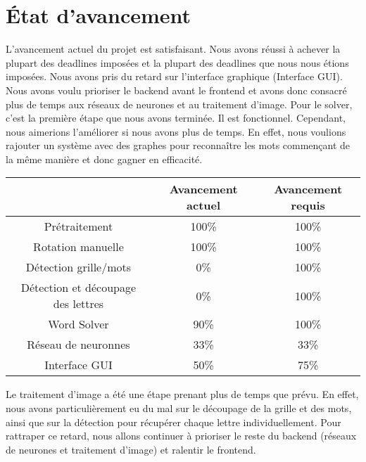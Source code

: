 \section{État d'avancement}

\hfill

\indent L'avancement actuel du projet est satisfaisant. Nous avons réussi à achever la plupart des deadlines imposées et la plupart des deadlines que nous nous étions imposées. Nous avons pris du retard sur l'interface graphique (Interface GUI). Nous avons voulu prioriser le backend avant le frontend et avons donc consacré plus de temps aux réseaux de neurones et au traitement d'image. \newline Pour le solver, c'est la première étape que nous avons terminée. Il est fonctionnel. Cependant, nous aimerions l'améliorer si nous avons plus de temps. En effet, nous voulions rajouter un système avec des graphes pour reconnaître les mots commençant de la même manière et donc gagner en efficacité. \newline

\hfill

\begin{tabular}{ | c | c | c | }
\hline 
   & Avancement actuel & Avancement requis \\
\hline 
   Prétraitement & 100\% & 100\% \\
\hline
   Rotation manuelle & 100\% & 100\% \\
\hline
   Détection grille/mots & 0\% & 100\% \\
\hline
   Détection et découpage des lettres & 0\% & 100\% \\
\hline
   Word Solver & 90\% & 100\% \\
\hline
   Réseau de neuronnes & 33\% & 33\% \\ 
\hline

   Interface GUI & 50\% & 75\% \\
\hline  
 \end{tabular}

\hfill \break
\hfill \break
\indent Le traitement d'image a été une étape prenant plus de temps que prévu. En effet, nous avons particulièrement eu du mal sur le découpage de la grille et des mots, ainsi que sur la détection pour récupérer chaque lettre individuellement. Pour rattraper ce retard, nous allons continuer à prioriser le reste du backend (réseaux de neurones et traitement d'image) et ralentir le frontend.
